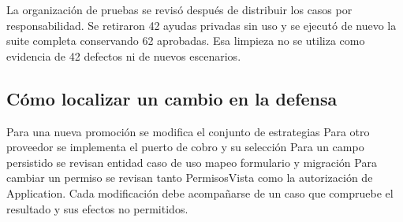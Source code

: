 La organización de pruebas se revisó después de distribuir los casos por responsabilidad. Se retiraron 42 ayudas privadas sin uso y se ejecutó de nuevo la suite completa conservando 62 aprobadas. Esa limpieza no se utiliza como evidencia de 42 defectos ni de nuevos escenarios.

\subsection{Cómo localizar un cambio en la defensa}
Para una nueva promoción se modifica el conjunto de estrategias Para otro proveedor se implementa el puerto de cobro y su selección Para un campo persistido se revisan entidad caso de uso mapeo formulario y migración Para cambiar un permiso se revisan tanto PermisosVista como la autorización de Application. Cada modificación debe acompañarse de un caso que compruebe el resultado y sus efectos no permitidos.
